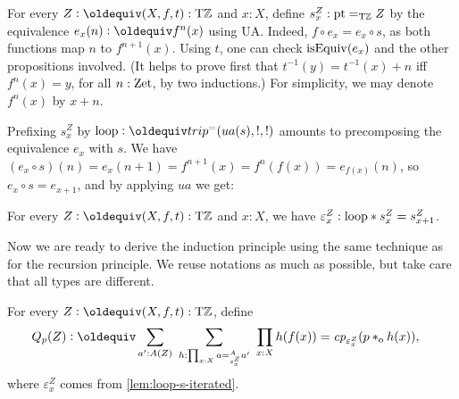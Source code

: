 \documentclass[a4,12pt]{amsart}
\begin{document}
\begin{definition}\label{def:loop-s-iterated}
For every $Z\defeq(X,f,t):\TorZ$ and $x:X$, 
define $s^Z_x: {\mathord{\mathrm{pt}}} =_{\mathrm{T}\mathbb{Z}} Z$ by the equivalence 
$e_x(n)\defeq f^n(x)$ using UA. 
Indeed, $f\circ e_x = e_x \circ s$, as both functions
map $n$ to $f^{n+1}(x)$. 
Using $t$, one can check $\mathrm{isEquiv}(e_x)$
and the other propositions involved.
(It helps to prove first that $t^{-1}(y)=t^{-1}(x)+n$
iff $f^n(x)=y$, for all $n:\mathrm{Zet}$, by two inductions.)
For simplicity, we may denote $f^n(x)$ by $x+n$.
\end{definition}

Prefixing $s^Z_x$ by $\Zloop\defeq trip^= (ua(s),!,!)$ amounts to
precomposing the equivalence $e_x$ with $s$. We have
$(e_x\circ s)(n) = e_x(n+1) = f^{n+1}(x) = f^n(f(x)) =e_{f(x)}(n)$,
so $e_x\circ s = e_{x+1}$, and by applying $ua$ we get:

\begin{lemma}\label{lem:loop-s-iterated}
  For every $Z\defeq(X,f,t):\TorZ$ and $x:X$, we have
  ${\varepsilon^Z_x}: \mathrm{loop} * s^Z_x = s^Z_{x+1}$. 
\end{lemma}

Now we are ready to derive the induction principle using the same 
technique as for the recursion principle. We reuse notations as much as
possible, but take care that all types are different.

\begin{definition}\label{def:guided-null-hmtps-dep}
For every $Z\defeq(X,f,t):\TorZ$, define
\begin{align*}\label{eq:TBD}
Q_p(Z)&\defeq \sum_{a' : A(Z)}~\sum_{h : \prod_{x:X} a =^A_{s^Z_x} a'}~\prod_{x:X} h(f(x)) = \cp{\varepsilon^Z_x}(p\cto h(x)),
\end{align*}
where $\varepsilon^Z_x$ comes from \cref{lem:loop-s-iterated}.
\end{definition}
\end{document}
